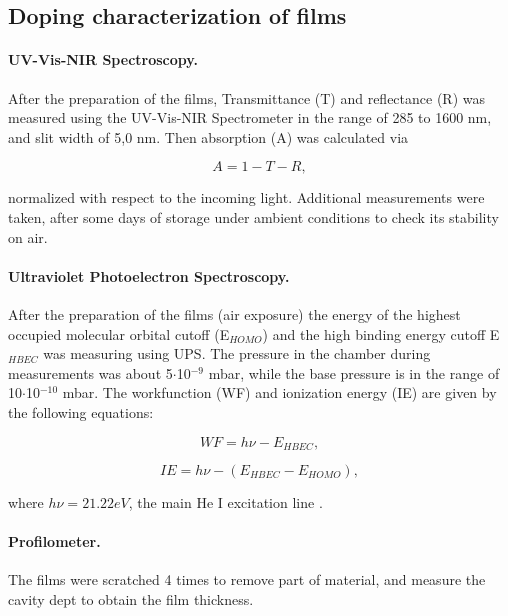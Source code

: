 \subsection{Doping characterization of films}

\paragraph{UV-Vis-NIR Spectroscopy.}After the preparation of the films, Transmittance (T) and reflectance (R) was measured using the UV-Vis-NIR Spectrometer in the range of 285 to 1600 nm, and slit width of 5,0 nm. Then absorption (A) was calculated via


\begin{equation}\label{eq:abs}
	A = 1 - T - R,
\end{equation}

normalized with respect to the incoming light. Additional measurements were taken, after some days of storage under ambient conditions to check its stability on air.

\paragraph{Ultraviolet Photoelectron Spectroscopy.}After the preparation of the films (air exposure) the energy of the highest occupied molecular orbital cutoff (E$_{HOMO}$) and the high binding energy cutoff E$_{HBEC}$ was measuring using UPS. The pressure in the chamber during measurements was about 5$\cdot$10$^{-9}$ mbar, while the base pressure is in the range of 10$\cdot$10$^{-10}$ mbar. The workfunction (WF) and ionization energy (IE) are given by the following equations:

\begin{equation}\label{eq:wf}
	WF = h\nu - E_{HBEC},
\end{equation}

\begin{equation}\label{eq:ie}
	IE = h\nu - (E_{HBEC}-E_{HOMO}),
\end{equation}

where $h\nu = 21.22 eV$, the main He I excitation line \cite{buchholtzDopingPropertiesNovel2021}. 

\paragraph{Profilometer.}The films were scratched 4 times to remove part of material, and measure the cavity dept to obtain the film thickness.


